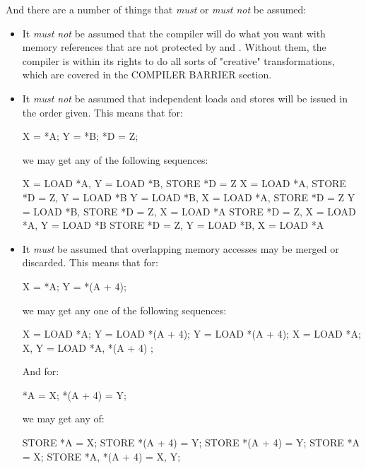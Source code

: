 And there are a number of things that \emph{must} or \emph{must not} be assumed:

\begin{itemize}
 \item It \emph{must not} be assumed that the compiler will do what you want
       with memory references that are not protected by  and
       .
       Without them, the compiler is within its rights to do all sorts of
       "creative" transformations, which are covered in the COMPILER BARRIER
       section.

 \item It \emph{must not} be assumed that independent loads and stores will be issued
       in the order given.  This means that for:

       \begin{VerbatimU}
	X = *A; Y = *B; *D = Z;
       \end{VerbatimU}

       we may get any of the following sequences:

       \begin{VerbatimU}
	X = LOAD *A,  Y = LOAD *B,  STORE *D = Z
	X = LOAD *A,  STORE *D = Z, Y = LOAD *B
	Y = LOAD *B,  X = LOAD *A,  STORE *D = Z
	Y = LOAD *B,  STORE *D = Z, X = LOAD *A
	STORE *D = Z, X = LOAD *A,  Y = LOAD *B
	STORE *D = Z, Y = LOAD *B,  X = LOAD *A
       \end{VerbatimU}

 \item It \emph{must} be assumed that overlapping memory accesses may be
       merged or discarded.
       This means that for:

       \begin{VerbatimU}
	X = *A; Y = *(A + 4);
       \end{VerbatimU}

       we may get any one of the following sequences:

       \begin{VerbatimU}
	X = LOAD *A; Y = LOAD *(A + 4);
	Y = LOAD *(A + 4); X = LOAD *A;
	{X, Y} = LOAD {*A, *(A + 4) };
       \end{VerbatimU}

       And for:

       \begin{VerbatimU}
	*A = X; *(A + 4) = Y;
       \end{VerbatimU}

       we may get any of:

       \begin{VerbatimU}
	STORE *A = X; STORE *(A + 4) = Y;
	STORE *(A + 4) = Y; STORE *A = X;
	STORE {*A, *(A + 4) } = {X, Y};
       \end{VerbatimU}
\end{itemize}

